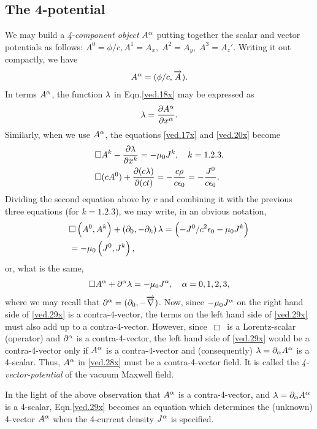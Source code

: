 \subsection{The 4-potential}
We may build  a \textsl{4-component object} $A^{{\alpha}}$ putting 
together  the  scalar and vector potentials  as follows: 
$A^0= \phi/c,  A^1=A_x,\; A^2=A_y,\; A^3=A_z' $.  Writing it 
out compactly, we have
\begin{align}\label{ved.28x}
A^{{\alpha}} =(\phi/c,\overrightarrow{A}).
\end{align}
In terms  $A^{{\alpha}}$, the function ${\lambda}$ in 
Eqn.\eqref{ved.18x} may be expressed as
\begin{align*}
 \lambda = \frac{{\partial}{A^{{\alpha}}}}{{\partial}{x^{{\alpha}}}}.
\end{align*}
Similarly, when we use $A^{{\alpha}}$, the equations 
\eqref{ved.17x} and \eqref{ved.20x} become
\begin{align*}
&\Box A^k- \frac{{\partial}{{\lambda}}}{{\partial}{x^k}}= -\mu_0 J^k,\quad k=1.2.3,\\
&\Box (cA^0)+\frac{{\partial}{(c{\lambda})}}{{\partial}{(ct)}}=-
\frac{c\rho}{c\epsilon_0}=-\frac{J^0}{c\epsilon_0}.
\end{align*}
Dividing the second equation above by $ c $ and combining it 
with the previous three equations (for $k=1.2.3$), we may 
write, in an obvious notation,
\begin{align*}
&\Box\left( A^0, A^k \right)+ \left({\partial}_0,
-{\partial}_k \right)\lambda=\left(- J^0/c^2\epsilon_0-\mu_0
J^k\right)\\&=-\mu_0\left( J^0, J^k \right),
\end{align*}
or, what is the same,
\begin{align}\label{ved.29x}
\Box A^{{\alpha}} +{\partial}^{{\alpha}} \lambda=-\mu_0 J^{{\alpha}} ,\quad
{\alpha}=0,1,2,3,
\end{align}
where we may recall that ${\partial}^{{\alpha}} =({\partial}_0,-{\overrightarrow{\nabla} }) $. Now, 
since $-\mu_0 J^{{\alpha}}$ on the right hand side  of 
\eqref{ved.29x} is a contra-4-vector, the terms on the left 
hand side of \eqref{ved.29x} must also add up to a 
contra-4-vector. However, since $\,\Box \, $ is a 
Lorentz-scalar (operator) and ${\partial}^{{\alpha}} $ is a 
contra-4-vector, the left hand side of \eqref{ved.29x} would 
be a contra-4-vector only if $A^{{\alpha}}$ is a  contra-4-vector 
and (consequently) $\lambda ={\partial}_{{\alpha}} A^{{\alpha}}$ is a 
4-scalar. Thus,  $A^{{\alpha}}$  in \eqref{ved.28x} must be  a 
contra-4-vector field. It is called the 
\textsl{4-vector-potential} of the vacuum Maxwell field.

In the light of the above observation that $A^{{\alpha}}$ is a 
contra-4-vector, and $\lambda ={\partial}_{{\alpha}} A^{{\alpha}}$ is a 
4-scalar,  Eqn.\eqref{ved.29x}  becomes an equation which 
determines the (unknown) 4-vector $A^{{\alpha}}$ when the 
4-current density  $J^{{\alpha}}$ is specified.

